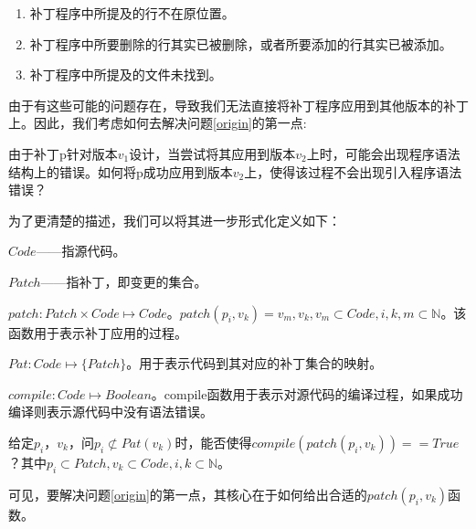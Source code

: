 \begin{enumerate}
	\item 补丁程序中所提及的行不在原位置。
	\item 补丁程序中所要删除的行其实已被删除，或者所要添加的行其实已被添加。
	\item 补丁程序中所提及的文件未找到。
\end{enumerate}

由于有这些可能的问题存在，导致我们无法直接将补丁程序应用到其他版本的补丁上。因此，我们考虑如何去解决问题\ref {origin}的第一点:

	由于补丁p针对版本$v_{1}$设计，当尝试将其应用到版本$v_{2}$上时，可能会出现程序语法结构上的错误。如何将p成功应用到版本$v_{2}$上，使得该过程不会出现引入程序语法错误？

为了更清楚的描述，我们可以将其进一步形式化定义如下：

\begin{definition}
	$Code$——指源代码。
\end{definition}

\begin{definition}
	$Patch$——指补丁，即变更的集合。
\end{definition}

\begin{definition}
	$patch: Patch \times Code \mapsto Code$。$patch(p_i,v_k) = v_m,v_k,v_m \subset Code,i,k,m \subset \mathbb{N}$。该函数用于表示补丁应用的过程。
\end{definition}

\begin{definition}
	$Pat: Code \mapsto \{Patch\}$。用于表示代码到其对应的补丁集合的映射。
\end{definition}

\begin{definition}
	$compile: Code \mapsto Boolean$。compile函数用于表示对源代码的编译过程，如果成功编译则表示源代码中没有语法错误。
\end{definition}

\begin{definition}
	\label {app_formal}
	给定$p_i$，$v_k$，问$p_i \not \subset Pat(v_k)$时，能否使得$compile(patch(p_i,v_k)) == True$？其中$p_i \subset Patch,v_k \subset Code,i,k \subset \mathbb{N}$。
\end{definition}

可见，要解决问题\ref {origin}的第一点，其核心在于如何给出合适的$patch(p_i,v_k)$函数。

